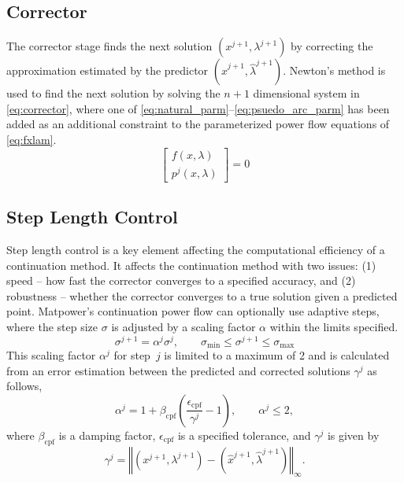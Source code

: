 \documentclass[12pt]{article}
\newcommand{\matpower}[0]{{\sc Matpower}}
\numberwithin{equation}{section}
\numberwithin{table}{section}
\numberwithin{figure}{section}
\begin{document}
\subsection{Corrector}
The corrector stage finds the next solution $\left(x^{j+1},\lambda^{j+1}\right)$ by correcting the approximation estimated by the predictor $(\hat{x}^{j+1},\hat{\lambda}^{j+1})$. Newton's method is used to find the next solution by solving the $n+1$ dimensional system in \eqref{eq:corrector}, where one of \eqref{eq:natural_parm}--\eqref{eq:psuedo_arc_parm} has been added as an additional constraint to the parameterized power flow equations of \eqref{eq:fxlam}.
\begin{equation} \left[\begin{array}{c}
 f(x,\lambda) \\
 p^j(x,\lambda)
 \end{array} \right]= 0
 \label{eq:corrector}
\end{equation}

\subsection{Step Length Control}
Step length control is a key element affecting the computational efficiency of a continuation method. It affects the continuation method with two issues: (1) speed -- how fast the corrector converges to a specified accuracy, and (2) robustness -- whether the corrector converges to a true solution given a predicted point. \matpower{}'s continuation power flow can optionally use adaptive steps, where the step size $\sigma$ is adjusted by a scaling factor $\alpha$ within the limits specified.
\begin{equation}
 \sigma^{j+1} = \alpha^j \sigma^j, \qquad \sigma_\mathrm{min} \le \sigma^{j+1} \le \sigma_\mathrm{max}
 \label{eq:cpf_step_adapt1}
\end{equation}
This scaling factor $\alpha^j$ for step~$j$ is limited to a maximum of 2 and is calculated from an error estimation between the predicted and corrected solutions $\gamma^j$ as follows,
\begin{equation}
 \alpha^j = 1 + \beta_\mathrm{cpf} \left(\dfrac{\epsilon_\mathrm{cpf}}{\gamma^j} - 1\right), \qquad \alpha^j \le 2,
 \label{eq:cpf_step_adapt2}
\end{equation}
where $\beta_\mathrm{cpf}$ is a damping factor, $\epsilon_\mathrm{cpf}$ is a specified tolerance, and $\gamma^j$ is given by
\begin{equation}
 \gamma^j = \left\Vert\left(x^{j+1},\lambda^{j+1}\right)-\left(\hat{x}^{j+1},\hat{\lambda}^{j+1}\right)\right\Vert_\infty.
 \label{eq:cpf_step_adapt3}
\end{equation}
\end{document}
